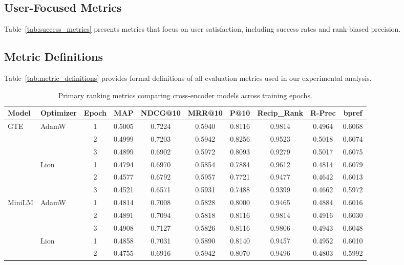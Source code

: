 \documentclass[conference]{IEEEtran}
\begin{document}
\subsection{User-Focused Metrics}
Table~\ref{tab:success_metrics} presents metrics that focus on user satisfaction, including success rates and rank-biased precision.

\subsection{Metric Definitions}
\label{app:metric_defs}
Table~\ref{tab:metric_definitions} provides formal definitions of all evaluation metrics used in our experimental analysis.

\begin{table}[t]
\centering
\caption{Primary ranking metrics comparing cross-encoder models across training epochs.}
\label{tab:primary_metrics}
\small
\begin{tabular}{llcccccccc}
\toprule
\textbf{Model} & \textbf{Optimizer} & \textbf{Epoch} & \textbf{MAP} & \textbf{NDCG@10} & \textbf{MRR@10} & \textbf{P@10} & \textbf{Recip\_Rank} & \textbf{R-Prec} & \textbf{bpref} \\
\midrule
\multirow{6}{*}{GTE} & \multirow{3}{*}{AdamW} 
 & 1 & 0.5005 & 0.7224 & 0.5940 & 0.8116 & 0.9814 & 0.4964 & 0.6068 \\
 & & 2 & 0.4999 & 0.7203 & 0.5942 & 0.8256 & 0.9523 & 0.5018 & 0.6074 \\
 & & 3 & 0.4899 & 0.6902 & 0.5972 & 0.8093 & 0.9279 & 0.5017 & 0.6075 \\
\cmidrule{2-10}
 & \multirow{3}{*}{Lion} 
 & 1 & 0.4794 & 0.6970 & 0.5854 & 0.7884 & 0.9612 & 0.4814 & 0.6079 \\
 & & 2 & 0.4577 & 0.6792 & 0.5957 & 0.7721 & 0.9477 & 0.4642 & 0.6013 \\
 & & 3 & 0.4521 & 0.6571 & 0.5931 & 0.7488 & 0.9399 & 0.4662 & 0.5972 \\
\midrule
\multirow{6}{*}{MiniLM} & \multirow{3}{*}{AdamW} 
 & 1 & 0.4814 & 0.7008 & 0.5828 & 0.8000 & 0.9465 & 0.4884 & 0.6016 \\
 & & 2 & 0.4891 & 0.7094 & 0.5818 & 0.8116 & 0.9814 & 0.4916 & 0.6030 \\
 & & 3 & 0.4908 & 0.7127 & 0.5826 & 0.8116 & 0.9806 & 0.4943 & 0.6048 \\
\cmidrule{2-10}
 & \multirow{3}{*}{Lion} 
 & 1 & 0.4858 & 0.7031 & 0.5890 & 0.8140 & 0.9457 & 0.4952 & 0.6010 \\
 & & 2 & 0.4755 & 0.6916 & 0.5942 & 0.8070 & 0.9496 & 0.4803 & 0.5992 \\

\end{tabular}
\end{table}
\end{document}
